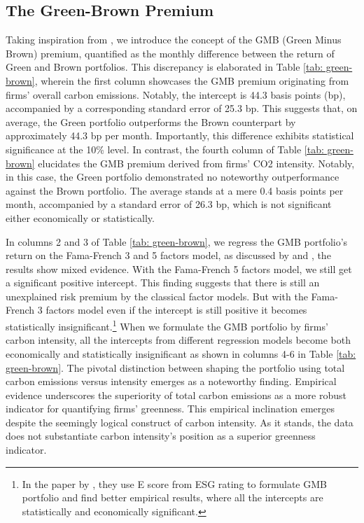 \documentclass[12pt]{article}
\begin{document}
\subsection{The Green-Brown Premium}

Taking inspiration from \cite{pastor2022dissecting}, we introduce the concept of the GMB (Green Minus Brown) premium, quantified as the monthly difference between the return of Green and Brown portfolios. This discrepancy is elaborated in Table \ref{tab: green-brown}, wherein the first column showcases the GMB premium originating from firms' overall carbon emissions. Notably, the intercept is 44.3 basis points (bp), accompanied by a corresponding standard error of 25.3 bp. This suggests that, on average, the Green portfolio outperforms the Brown counterpart by approximately 44.3 bp per month. Importantly, this difference exhibits statistical significance at the 10\% level. In contrast, the fourth column of Table \ref{tab: green-brown} elucidates the GMB premium derived from firms' CO2 intensity. Notably, in this case, the Green portfolio demonstrated no noteworthy outperformance against the Brown portfolio. The average stands at a mere 0.4 basis points per month, accompanied by a standard error of 26.3 bp, which is not significant either economically or statistically.

In columns 2 and 3 of Table \ref{tab: green-brown}, we regress the GMB portfolio's return on the Fama-French 3 and 5 factors model, as discussed by \cite{fama2015five} and \cite{fama1993common}, the results show mixed evidence. With the Fama-French 5 factors model, we still get a significant positive intercept. This finding suggests that there is still an unexplained risk premium by the classical factor models. But with the Fama-French 3 factors model even if the intercept is still positive it becomes statistically insignificant.\footnote{In the paper by \cite{pastor2022dissecting}, they use E score from ESG rating to formulate GMB portfolio and find better empirical results, where all the intercepts are statistically and economically significant.} When we formulate the GMB portfolio by firms' carbon intensity, all the intercepts from different regression models become both economically and statistically insignificant as shown in columns 4-6 in Table \ref{tab: green-brown}. The pivotal distinction between shaping the portfolio using total carbon emissions versus intensity emerges as a noteworthy finding. Empirical evidence underscores the superiority of total carbon emissions as a more robust indicator for quantifying firms' greenness. This empirical inclination emerges despite the seemingly logical construct of carbon intensity. As it stands, the data does not substantiate carbon intensity's position as a superior greenness indicator.
\end{document}
